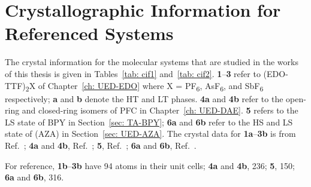 
\chapter{Crystallographic Information for Referenced Systems}
\label{ap: cif}

The crystal information for the molecular systems that are studied in the works of this thesis
is given in Tables~\ref{tab: cif1} and~\ref{tab: cif2}.
%
\textbf{1}--\textbf{3} refer to (EDO-TTF)\textsubscript{2}X of Chapter~\ref{ch: UED-EDO}
where X = PF\textsubscript{6}, AsF\textsubscript{6}, and SbF\textsubscript{6} respectively;
\textbf{a} and \textbf{b} denote the HT and LT phases.
\textbf{4a} and \textbf{4b} refer to the open-ring and closed-ring isomers of PFC in Chapter~\ref{ch: UED-DAE}.
\textbf{5} refers to the LS state of BPY in Section~\ref{sec: TA-BPY};
\textbf{6a} and \textbf{6b} refer to the HS and LS state of (AZA) in Section~\ref{sec: UED-AZA}.
%
The crystal data for \textbf{1a}--\textbf{3b} is from Ref.~\cite{NakanoX};
\textbf{4a} and \textbf{4b}, Ref.~\cite{Irie2001};
\textbf{5}, Ref.~\cite{Dick1998};
\textbf{6a} and \textbf{6b}, Ref.~\cite{Guionneau1999}.

For reference, \textbf{1b}--\textbf{3b} have 94 atoms in their unit cells;
\textbf{4a} and \textbf{4b}, 236; \textbf{5}, 150; \textbf{6a} and \textbf{6b}, 316.


